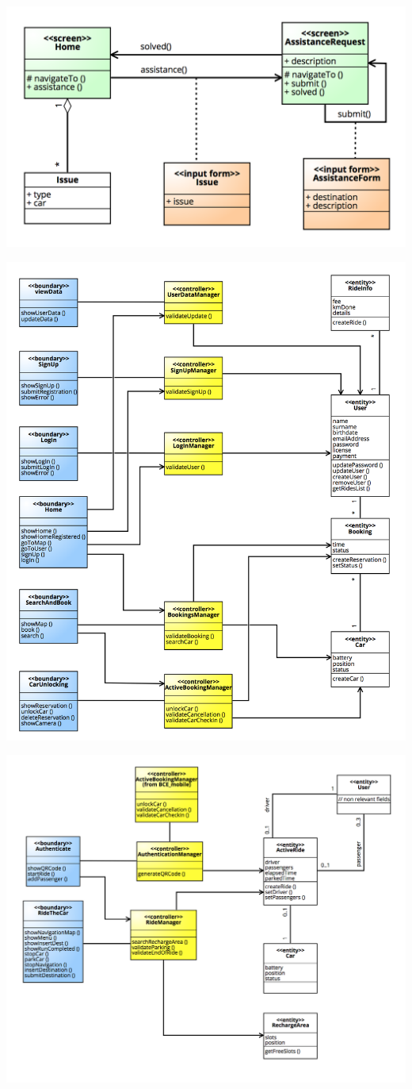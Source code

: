 \documentclass[]{article}
\begin{document}
\centerline{\includegraphics{./images/UX_Operator.png}}
\centerline{\includegraphics{./images/BCE_Mobile.png}}
\centerline{\includegraphics{./images/BCE_Car.png}}
\end{document}
